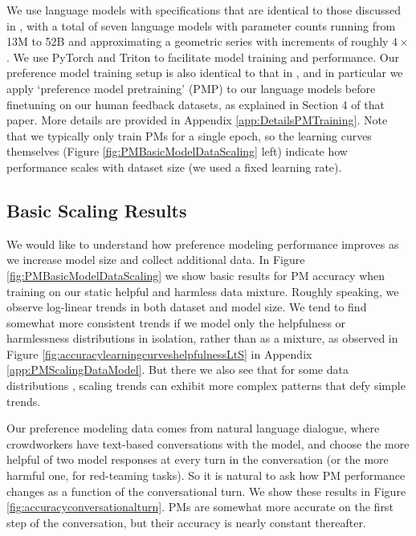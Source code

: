 We use language models with  specifications that are identical to those discussed in \cite{askell2021general}, with a total of seven language models with parameter counts running from 13M to 52B and approximating a geometric series with increments of roughly $4 \times$.  We use PyTorch \cite{Pytorch} and Triton \cite{Triton} to facilitate model training and performance.  Our preference model training setup is also identical to that in \cite{askell2021general}, and in particular we apply `preference model pretraining' (PMP) to our language models before finetuning on our human feedback datasets, as explained in Section 4 of that paper.  More details are provided in Appendix \ref{app:DetailsPMTraining}.  Note that we typically only train PMs for a single epoch, so the learning curves themselves (Figure \ref{fig:PMBasicModelDataScaling} left) indicate how performance scales with dataset size (we used a fixed learning rate).

\subsection{Basic Scaling Results}
\label{sec:BasicScaling}

We would like to understand how preference modeling performance improves as we increase model size and collect additional data.   In Figure \ref{fig:PMBasicModelDataScaling} we show basic results for PM accuracy when training on our static helpful and harmless data mixture.  Roughly speaking, we observe log-linear trends in both dataset and model size.  We tend to find somewhat more consistent trends if we model only the helpfulness or harmlessness distributions in isolation, rather than as a mixture, as observed in Figure \ref{fig:accuracylearningcurveshelpfulnessLtS} in Appendix \ref{app:PMScalingDataModel}.  But there we also see that for some data distributions \cite{stiennon2020learning}, scaling trends can exhibit more complex patterns that defy simple trends.

Our preference modeling data comes from natural language dialogue, where crowdworkers have text-based conversations with the model, and choose the more helpful of two model responses at every turn in the conversation (or the more harmful one, for red-teaming tasks).  So it is natural to ask how PM performance changes as a function of the conversational turn.  We show these results in Figure \ref{fig:accuracyconversationalturn}.  PMs are somewhat more accurate on the first step of the conversation, but their accuracy is nearly constant thereafter.   

